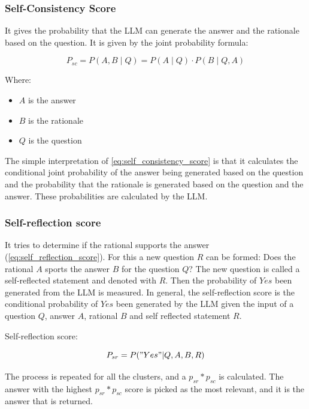 \documentclass{wseas}
\begin{document}
\subsubsection{Self-Consistency Score}

It gives the probability that the LLM can generate the answer and the
rationale based on the question. It is given by the joint probability
formula:

\begin{equation}
  P_{sc} = P(A,B \mid Q) = P(A \mid Q) \cdot P(B \mid Q, A)
  \label{eq:self_consistency_score}
\end{equation}
  
Where:
\begin{itemize}
  \item \( A \) is the answer
  \item \( B \) is the rationale
  \item \( Q \) is the question
\end{itemize}

The simple interpretation of \autoref{eq:self_consistency_score} is that it
calculates the conditional joint probability of the answer being generated based on the question 
and the probability that the rationale is generated based on the question and the
answer. These probabilities are calculated by the LLM. 

\subsubsection{Self-reflection score}

It tries to determine if the rational supports the answer (\autoref{eq:self_reflection_score}). For this a new
question $R$ can be formed: Does the rational $A$ sports the answer
$B$ for the question $Q$? The new question is called a
self-reflected statement and denoted with $R$. Then the probability of $Yes$
been generated from the LLM is measured. In general, the self-reflection
score is the conditional probability of $Yes$ been generated by the
LLM given the input of a question $Q$, answer $A$, rational $B$ and self
reflected statement $R$.

Self-reflection score: 

\begin{equation}
  P_{sr} = P("Yes"|Q, A, B, R)
  \label{eq:self_reflection_score}  
\end{equation}

The process is repeated for all the clusters, and a \(p_{sr}*p_{sc}\) is
calculated. The answer with the highest \(p_{sr}*p_{sc}\) score is
picked as the most relevant, and it is the answer that is returned.
\end{document}
